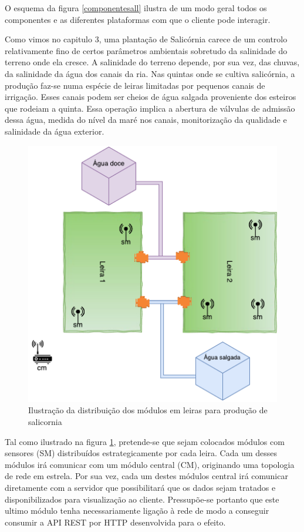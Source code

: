 O esquema da figura \ref{componentesall} ilustra de um modo geral todos os componentes e as diferentes plataformas com que o cliente pode interagir. 


Como vimos no capitulo 3, uma plantação de  Salicórnia carece de um controlo relativamente fino de certos parâmetros ambientais sobretudo da salinidade do terreno onde ela cresce. A salinidade do terreno depende, por sua vez, das chuvas, da salinidade da água dos canais da ria. Nas quintas onde se cultiva salicórnia, a produção faz-se numa espécie de leiras limitadas por pequenos canais de irrigação. Esses canais podem ser cheios de água salgada proveniente dos esteiros que rodeiam a quinta. Essa operação implica a abertura de válvulas de admissão dessa água, medida do nível da maré nos canais, monitorização da qualidade e salinidade da água exterior.



\begin{figure}[!htb]
	\centering
	\includegraphics[scale=0.55]{esquemas/leiras-comm-geral.pdf}
	\caption{Ilustração da distribuição dos módulos em leiras para produção de salicornia }
	\label{leira}
\end{figure}


Tal como ilustrado na figura \ref{leira}, pretende-se que sejam colocados módulos com sensores (\acl{SM}) distribuídos estrategicamente por cada leira. Cada um desses módulos irá comunicar com um módulo central (\acl{CM}), originando uma topologia de rede em estrela.  Por sua vez, cada um destes módulos central irá comunicar diretamente com a servidor que possibilitará que os dados sejam tratados e disponibilizados para visualização ao cliente. Pressupõe-se portanto que este ultimo módulo tenha necessariamente ligação à rede de modo a conseguir consumir a API REST por HTTP desenvolvida para o efeito. 


